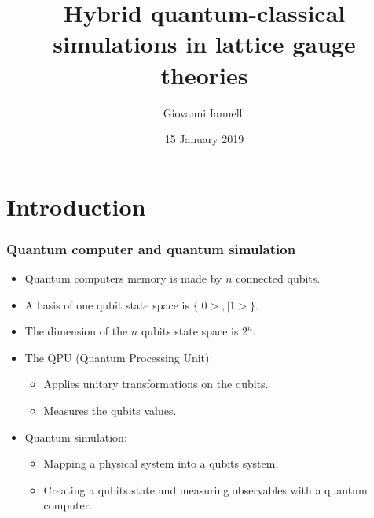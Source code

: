 \documentclass[10pt,t,xcolor=dvipsnames,aspectratio=169]{beamer}
\title[Fellow project presentation]{Hybrid quantum-classical simulations in lattice gauge theories}
\author{Giovanni Iannelli}
\institute{Humboldt University of Berlin}
\date{15 January 2019}
\newlength\leftsidebar
\begin{document}
\leftsidebar
{
\begin{frame}[plain,t]
\titlepage
\end{frame}
}
\hoffset=0in %


\section{Introduction}


\begin{frame}
    \frametitle{Quantum computer and quantum simulation}
    \begin{itemize}
        \item
            Quantum computers memory is made by $n$ connected qubits.
        \item
            A basis of one qubit state space is $\{|0>,|1>\}$.
        \item
            The dimension of the $n$ qubits state space is $2^n$.
        \item
            The QPU (Quantum Processing Unit):
            \begin{itemize}
                \item Applies unitary transformations on the qubits.
                \item Measures the qubits values.
            \end{itemize}
        \item
            Quantum simulation:
            \begin{itemize}
                \item
                    Mapping a physical system into a qubits system.
                \item
                    Creating a qubits state and measuring observables with a quantum computer.
            \end{itemize}
    \end{itemize}
\end{frame}
\end{document}
